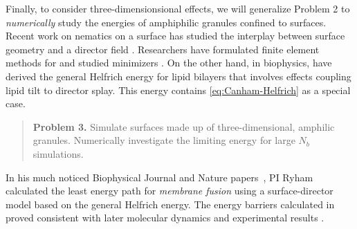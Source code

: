 Finally, to consider three-dimensionsional effects, we
will generalize Problem 2 to \emph{numerically}
study the energies of amphiphilic granules confined to surfaces.
Recent work on nematics on a surface has studied
the interplay between 
surface geometry and a director field
\cite{Nestler2020PropertiesOS, Nitschke2018NematicLC,
  Nestler2018OrientationalOO, Nitschke2019HydrodynamicII,
  Nitschke2020LiquidCO}.
Researchers have formulated finite element methods for
\cite{Bartels2012FiniteEM, Nochetto2015NumericsFL,
  Nestler2019AFE}
  and studied minimizers
\cite{Segatti2014EquilibriumCO,Segatti2014AnalysisOA}.
On the other hand, in biophysics,
\cite{Hamm2000ElasticEO,Terzi2019CurvatureTiltTO,Terzi2019ACQ,Terzi2017NovelTC,Pinigin2020NewCT} have
derived the general Helfrich energy for lipid bilayers
that involves effects coupling lipid tilt to 
director splay.  This energy contains \eqref{eq:Canham-Helfrich}
as a special case.
\begin{quotation}
\textbf{Problem 3.}
Simulate surfaces made up of three-dimensional, amphilic granules.
Numerically investigate the limiting energy for large $N_b$ simulations.
\end{quotation}
In his much noticed Biophysical Journal
and Nature papers~\cite{RyKlYaCo16,Chetal16}, PI Ryham
calculated the least energy path for \emph{membrane fusion}
using a surface-director model based on the general Helfrich energy. 
The energy barriers calculated in~\cite{RyKlYaCo16} 
proved consistent with later molecular dynamics
and experimental results \cite{SmRiMu19,2017PNAS..114.1238F}.

